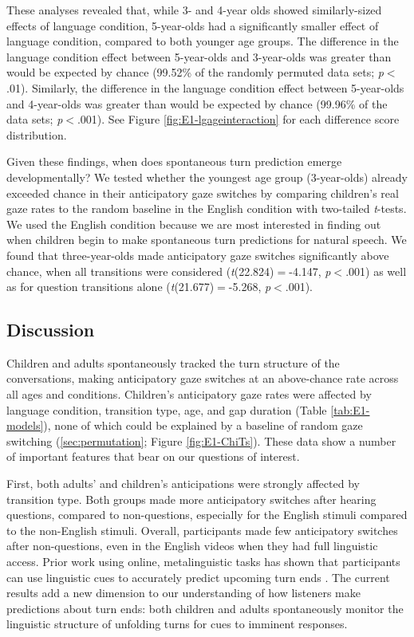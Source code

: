 \documentclass[authoryear, 12pt]{elsarticle}
\begin{document}
These analyses revealed that, while 3- and 4-year olds showed similarly-sized effects of language condition, 5-year-olds had a significantly smaller effect of language condition, compared to both younger age groups. The difference in the language condition effect between 5-year-olds and 3-year-olds was greater than would be expected by chance (99.52\% of the randomly permuted data sets; \textit{p}$<$.01). Similarly, the difference in the language condition effect between 5-year-olds and 4-year-olds was greater than would be expected by chance (99.96\% of the data sets; \textit{p}$<$.001). See Figure \ref{fig:E1-lgageinteraction} for each difference score distribution.

Given these findings, when does spontaneous turn prediction emerge developmentally? We tested whether the youngest age group (3-year-olds) already exceeded chance in their anticipatory gaze switches by comparing children's real gaze rates to the random baseline in the English condition with two-tailed \textit{t}-tests. We used the English condition because we are most interested in finding out when children begin to make spontaneous turn predictions for natural speech. We found that three-year-olds made anticipatory gaze switches significantly above chance, when all transitions were considered (\textit{t}(22.824)$=$-4.147, \textit{p}$<$.001) as well as for question transitions alone (\textit{t}(21.677)$=$-5.268, \textit{p}$<$.001).

\subsection*{Discussion}
\label{sec:discussion1}

Children and adults spontaneously tracked the turn structure of the conversations, making anticipatory gaze switches at an above-chance rate across all ages and conditions. Children's anticipatory gaze rates were affected by language condition, transition type, age, and gap duration (Table \ref{tab:E1-models}), none of which could be explained by a baseline of random gaze switching (\ref{sec:permutation}; Figure \ref{fig:E1-ChiTs}). These data show a number of important features that bear on our questions of interest. 

First, both adults' and children's anticipations were strongly affected by transition type. Both groups made more anticipatory switches after hearing questions, compared to non-questions, especially for the English stimuli compared to the non-English stimuli. Overall, participants made few anticipatory switches after non-questions, even in the English videos when they had full linguistic access. Prior work using online, metalinguistic tasks has shown that participants can use linguistic cues to accurately predict upcoming turn ends \citep{torreira2015, magyari2012, de-ruiter2006}. The current results add a new dimension to our understanding of how listeners make predictions about turn ends: both children and adults spontaneously monitor the linguistic structure of unfolding turns for cues to imminent responses.
\end{document}
